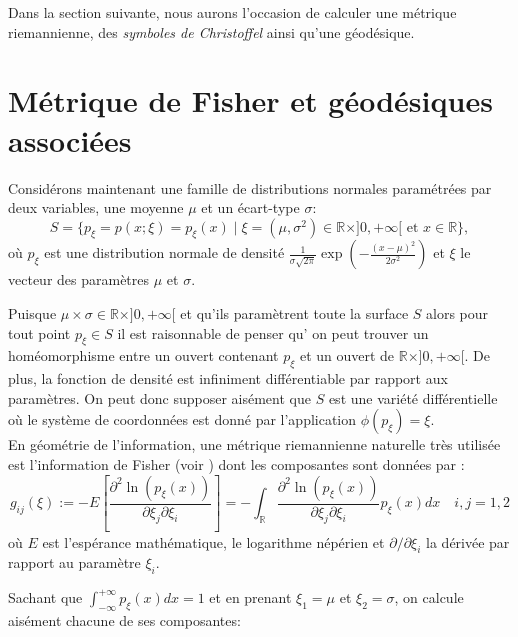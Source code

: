 \documentclass[11pt,french]{article}
\begin{document}
Dans la section suivante, nous aurons l'occasion de calculer une métrique riemannienne, des \textit{symboles de Christoffel} ainsi qu'une géodésique.\\


\section{Métrique de Fisher et géodésiques associées} 
Considérons maintenant une famille de distributions normales paramétrées par deux variables, une moyenne $\mu$ et un écart-type $\sigma$:
\begin{equation}\label{my_manifold}
	S=\{p_{\xi}=p(x;\xi)=p_{\xi}(x) \mid \xi=(\mu, \sigma^2)\in\mathbb{R} \times ]{ 0,+\infty[} \text{ et } x\in\mathbb{R}\}, 
\end{equation}
où $p_{\xi}$ est une distribution normale de densité $\frac{1}{\sigma\sqrt{2\pi}}\exp\left(-\frac{(x-\mu)^2}{2\sigma^2}\right)$ et $\xi$ le vecteur des paramètres $\mu$ et $\sigma$. 

Puisque $\mu\times\sigma\in\mathbb{R} \times ]{0,+\infty[}$ et qu'ils paramètrent toute la surface $S$ alors pour tout point $p_{\xi}\in S$ il est raisonnable de penser qu'  on peut trouver un homéomorphisme entre un ouvert contenant $p_{\xi}$ et un ouvert de $\mathbb{R} \times ]{0,+\infty[}$. De plus, la fonction de densité est infiniment différentiable par rapport aux paramètres. On peut donc supposer aisément que $S$ est une variété différentielle où le système de coordonnées est donné par l'application $\phi(p_{\xi})=\xi$.\\

En géométrie de l'information, une métrique riemannienne naturelle très utilisée est l'information de Fisher (voir \cite[Proposition 1.7.1]{calin2014geometric}) dont les composantes sont données par  :
\begin{equation*}
	g_{ij}(\xi):= -E\left[\frac{\partial^2\ln(p_{\xi}(x))}{\partial\xi_j\partial\xi_i}\right]=-\int_{\mathbb{R}}\frac{\partial^2\ln(p_{\xi}(x))}{\partial\xi_j\partial\xi_i}p_{\xi}(x)dx \quad i,j=1,2
\end{equation*}  
où $E$ est l'espérance mathématique,  le logarithme népérien et $\partial/\partial\xi_i$ la dérivée par rapport au paramètre $\xi_i$.

Sachant que $\int_{-\infty}^{+\infty}p_{\xi}(x)dx=1$ et en prenant $\xi_1=\mu$ et $\xi_2=\sigma$, on calcule aisément chacune de ses composantes:
\end{document}
